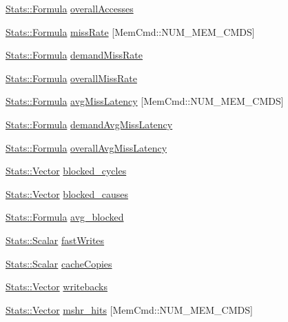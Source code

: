 \begin{DoxyCompactItemize}
\hyperlink{classStats_1_1Formula}{Stats::Formula} \hyperlink{group__CacheStatistics_ga84cca53e5e12d55fe025a3a22bd77a28}{overallAccesses}
\item 
\hyperlink{classStats_1_1Formula}{Stats::Formula} \hyperlink{group__CacheStatistics_gabe84abb4bee43d594923487ba5e013c1}{missRate} \mbox{[}MemCmd::NUM\_\-MEM\_\-CMDS\mbox{]}
\item 
\hyperlink{classStats_1_1Formula}{Stats::Formula} \hyperlink{group__CacheStatistics_ga58de8cb7b3151d13ca30115eee7cd475}{demandMissRate}
\item 
\hyperlink{classStats_1_1Formula}{Stats::Formula} \hyperlink{group__CacheStatistics_ga61b6b530510b172ca4c2774dd939debf}{overallMissRate}
\item 
\hyperlink{classStats_1_1Formula}{Stats::Formula} \hyperlink{group__CacheStatistics_ga964a436d0a0ae4006fe5a8b418058e44}{avgMissLatency} \mbox{[}MemCmd::NUM\_\-MEM\_\-CMDS\mbox{]}
\item 
\hyperlink{classStats_1_1Formula}{Stats::Formula} \hyperlink{group__CacheStatistics_ga4a5f08d40501e08ed841c65206fc7757}{demandAvgMissLatency}
\item 
\hyperlink{classStats_1_1Formula}{Stats::Formula} \hyperlink{group__CacheStatistics_ga1246f7d24c92b2c043128804bb772c53}{overallAvgMissLatency}
\item 
\hyperlink{classStats_1_1Vector}{Stats::Vector} \hyperlink{group__CacheStatistics_ga4acd5af734aeaacf375fb724164623a2}{blocked\_\-cycles}
\item 
\hyperlink{classStats_1_1Vector}{Stats::Vector} \hyperlink{group__CacheStatistics_ga7868c651a1ef44806d546d9a018835cc}{blocked\_\-causes}
\item 
\hyperlink{classStats_1_1Formula}{Stats::Formula} \hyperlink{group__CacheStatistics_ga61f8d4c8d21aa6b9347cb04bd401d05f}{avg\_\-blocked}
\item 
\hyperlink{classStats_1_1Scalar}{Stats::Scalar} \hyperlink{group__CacheStatistics_gaaa4a7e9f5dcb48cc5a53ac2335e934b3}{fastWrites}
\item 
\hyperlink{classStats_1_1Scalar}{Stats::Scalar} \hyperlink{group__CacheStatistics_ga733d9eeafaa8c6f179cf5ed460e36ce0}{cacheCopies}
\item 
\hyperlink{classStats_1_1Vector}{Stats::Vector} \hyperlink{group__CacheStatistics_gace2b37e760e47862f243e4b03c05ef5e}{writebacks}
\item 
\hyperlink{classStats_1_1Vector}{Stats::Vector} \hyperlink{group__CacheStatistics_ga92faf658f75559bd75a8839d4de1f8a9}{mshr\_\-hits} \mbox{[}MemCmd::NUM\_\-MEM\_\-CMDS\mbox{]}

\end{DoxyCompactItemize}
